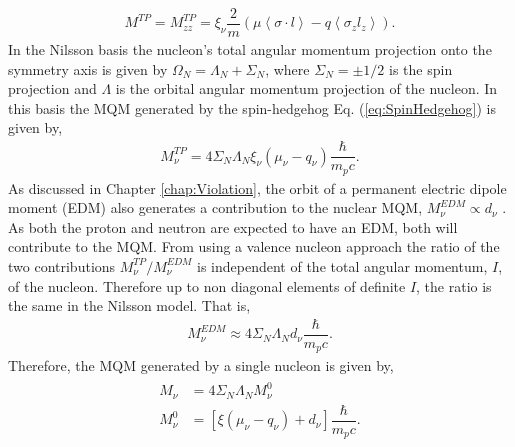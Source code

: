 \documentclass[10pt,a4paper, twoside, openright]{report}
\begin{document}
\begin{align}
M^{TP}  = M_{zz}^{TP} = \xi_{\nu}\dfrac{2}{m}\left(\mu\left<\sigma\cdot l \right> - q\left<\sigma_z l_z\right>\right) .
\end{align}
In the Nilsson basis \cite{Nilsson1955} the nucleon's total angular momentum projection onto the symmetry axis is given by $\Omega_N = \Lambda_N + \Sigma_N$, where $\Sigma_N = \pm 1/2$ is the spin projection and $\Lambda$ is the orbital angular momentum projection of the nucleon. In this basis the MQM  generated by the spin-hedgehog Eq. (\ref{eq:SpinHedgehog}) is given by,
\begin{align}
M^{TP}_{\nu} = 4\Sigma_N\Lambda_N\xi_{\nu}\left(\mu_{\nu} - q_{\nu}\right)\dfrac{\hbar}{m_p c}.
\end{align} 
As discussed in Chapter \ref{chap:Violation}, the orbit of a permanent electric dipole moment (EDM) also  generates a contribution to the nuclear MQM, $M_{\nu}^{EDM} \propto d_{\nu}$ \cite{Khriplovich1976}. As both the proton and neutron are expected to have an EDM, both will contribute to the MQM. From \cite{Flambaum2014} using a valence nucleon approach the ratio of the two contributions $M^{TP}_{\nu}/M_{\nu}^{EDM}$ is independent of the total angular momentum, $I$, of the nucleon. Therefore up to non diagonal elements of definite $I$, the ratio is the same in the Nilsson model. That is,
\begin{align}
M_{\nu}^{EDM} \approx  4\Sigma_N\Lambda_N d_{\nu}\dfrac{\hbar}{m_p c}.
\end{align}
Therefore, the MQM generated by a single nucleon is given by,
\begin{align}\label{eq:NuclearMQM} 
\begin{split}
M_{\nu} &= 4\Sigma_N\Lambda_N M_{\nu}^0 \\ 
M_{\nu}^0 &= \left[\xi\left(\mu_{\nu} - q_{\nu}\right) + d_{\nu}\right]\dfrac{\hbar}{m_p c}. 
\end{split}
\end{align}
\end{document}
